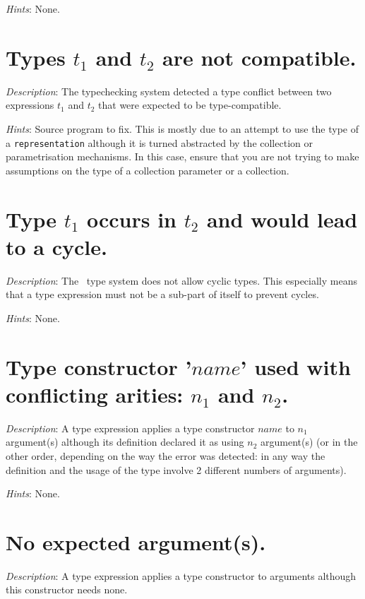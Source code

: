 {\em Hints}: None.



\section*{Types $t_1$ and $t_2$ are not compatible.}
{\em Description}: The typechecking system detected a type conflict
between two expressions $t_1$ and $t_2$ that were expected to be
type-compatible.

{\em Hints}: Source program to fix. This is mostly due to an attempt
to use the type of a {\tt representation} although it is turned
abstracted by the collection or parametrisation mechanisms. In this
case, ensure that you are not trying to make assumptions on the type
 of a collection parameter or a collection.



\section*{Type $t_1$ occurs in $t_2$ and would lead to a cycle.}
{\em Description}: The \focal\ type system does not allow cyclic
types. This especially means that a type expression must not be a
sub-part of itself to prevent cycles.

{\em Hints}: None.



\section*{Type constructor '$name$' used with conflicting arities:
  $n_1$ and $n_2$.}
{\em Description}: A type expression applies a type constructor $name$
to $n_1$ argument(s) although its definition declared it as using $n_2$
argument(s) (or in the other order, depending on the way the error was
detected: in any way the definition and the usage of the type involve
2 different numbers of arguments).

{\em Hints}: None.



\section*{No expected argument(s).}
{\em Description}: A type expression applies a type constructor to
arguments although this constructor needs none.

